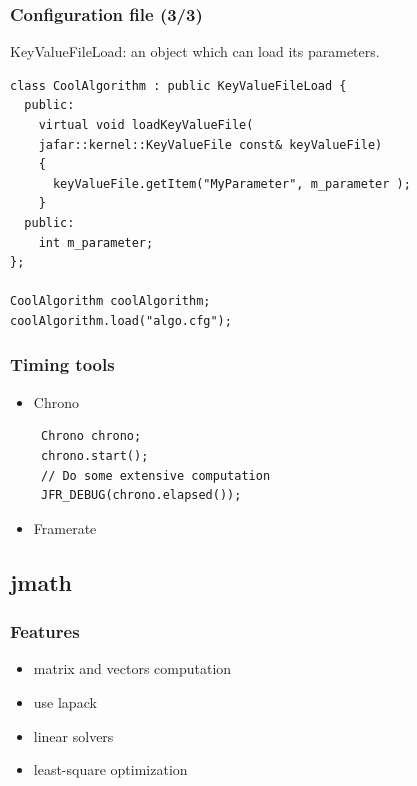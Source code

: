 \documentclass[compress]{beamer}
\begin{document}

\begin{frame}[fragile]
  \frametitle{Configuration file (3/3)}
KeyValueFileLoad: an object which can load its parameters.
 
\begin{lstlisting}
class CoolAlgorithm : public KeyValueFileLoad {
  public:
    virtual void loadKeyValueFile(
    jafar::kernel::KeyValueFile const& keyValueFile)
    {
      keyValueFile.getItem("MyParameter", m_parameter );
    }
  public:
    int m_parameter;
};

CoolAlgorithm coolAlgorithm;
coolAlgorithm.load("algo.cfg");
\end{lstlisting}
 
\end{frame}


\begin{frame}[fragile]
  \frametitle{Timing tools}
  \begin{itemize}
    \item<1-> Chrono
\begin{lstlisting}
 Chrono chrono;
 chrono.start();
 // Do some extensive computation
 JFR_DEBUG(chrono.elapsed());
\end{lstlisting}
    \item<2-> Framerate
  \end{itemize}

\end{frame}


\subsection{jmath}
\begin{frame}
  \frametitle{Features}
  \begin{itemize}
   \item matrix and vectors computation
   \item use lapack
   \item linear solvers
   \item least-square optimization
  \end{itemize}
\end{frame}
\end{document}
